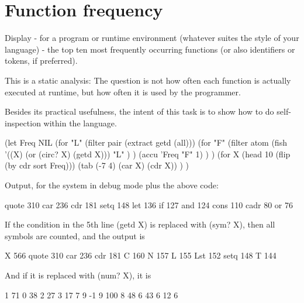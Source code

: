 \pagebreak{}
\section*{Function frequency}

Display - for a program or runtime environment (whatever suites the
style of your language) - the top ten most frequently occurring
functions (or also identifiers or tokens, if preferred).

This is a static analysis: The question is not how often each function
is actually executed at runtime, but how often it is used by the
programmer.

Besides its practical usefulness, the intent of this task is to show how
to do self-inspection within the language.


\begin{wideverbatim}

(let Freq NIL
   (for "L" (filter pair (extract getd (all)))
      (for "F"
         (filter atom
            (fish '((X) (or (circ? X) (getd X)))
               "L" ) )
         (accu 'Freq "F" 1) ) )
   (for X (head 10 (flip (by cdr sort Freq)))
      (tab (-7 4) (car X) (cdr X)) ) )

Output, for the system in debug mode plus the above code:

quote   310
car     236
cdr     181
setq    148
let     136
if      127
and     124
cons    110
cadr     80
or       76

If the condition in the 5th line (getd X) is replaced with (sym? X), then all
symbols are counted, and the output is

X       566
quote   310
car     236
cdr     181
C       160
N       157
L       155
Lst     152
setq    148
T       144

And if it is replaced with (num? X), it is

1        71
0        38
2        27
3        17
7         9
-1        9
100       8
48        6
43        6
12        6

\end{wideverbatim}



% 
